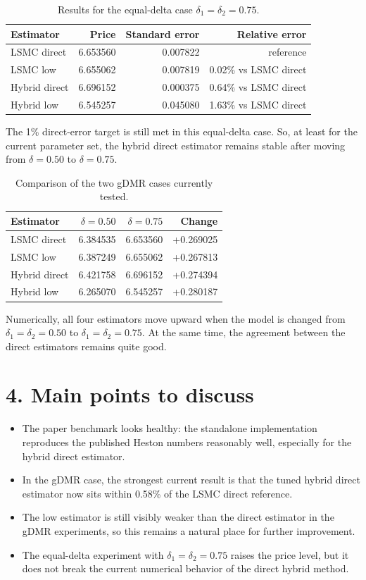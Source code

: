 \documentclass[11pt]{article}
\begin{document}
\begin{table}[h]
\centering
\caption{Results for the equal-delta case $\delta_1=\delta_2=0.75$.}
\begin{tabular}{lrrr}
\toprule
Estimator & Price & Standard error & Relative error \\
\midrule
LSMC direct   & 6.653560 & 0.007822 & reference \\
LSMC low      & 6.655062 & 0.007819 & 0.02\% vs LSMC direct \\
Hybrid direct & 6.696152 & 0.000375 & 0.64\% vs LSMC direct \\
Hybrid low    & 6.545257 & 0.045080 & 1.63\% vs LSMC direct \\
\bottomrule
\end{tabular}
\end{table}

The 1\% direct-error target is still met in this equal-delta case. So, at least for the current parameter set,
the hybrid direct estimator remains stable after moving from $\delta=0.50$ to $\delta=0.75$.

\begin{table}[h]
\centering
\caption{Comparison of the two gDMR cases currently tested.}
\begin{tabular}{lrrr}
\toprule
Estimator & $\delta=0.50$ & $\delta=0.75$ & Change \\
\midrule
LSMC direct   & 6.384535 & 6.653560 & +0.269025 \\
LSMC low      & 6.387249 & 6.655062 & +0.267813 \\
Hybrid direct & 6.421758 & 6.696152 & +0.274394 \\
Hybrid low    & 6.265070 & 6.545257 & +0.280187 \\
\bottomrule
\end{tabular}
\end{table}

Numerically, all four estimators move upward when the model is changed from $\delta_1=\delta_2=0.50$ to
$\delta_1=\delta_2=0.75$. At the same time, the agreement between the direct estimators remains quite good.

\section*{4. Main points to discuss}

\begin{itemize}
\item The paper benchmark looks healthy: the standalone implementation reproduces the published Heston numbers reasonably well, especially for the hybrid direct estimator.
\item In the gDMR case, the strongest current result is that the tuned hybrid direct estimator now sits within 0.58\% of the LSMC direct reference.
\item The low estimator is still visibly weaker than the direct estimator in the gDMR experiments, so this remains a natural place for further improvement.
\item The equal-delta experiment with $\delta_1=\delta_2=0.75$ raises the price level, but it does not break the current numerical behavior of the direct hybrid method.
\end{itemize}
\end{document}
